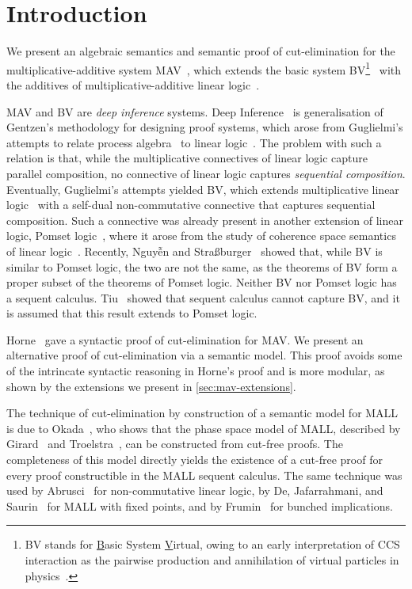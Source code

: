 \section{Introduction}\label{sec:introduction}

We present an algebraic semantics and semantic proof of cut-elimination for the multiplicative-additive system MAV~\cite{Horne15:mav}, which extends the basic system BV\footnote{
      BV stands for \underline{B}asic System \underline{V}irtual, owing to an early interpretation of CCS interaction as the pairwise production and annihilation of virtual particles in physics~\cite[]{Horne15:mav}.
}~\cite{Guglielmi99:bv,Guglielmi07:sis} with the additives of multiplicative-additive linear logic~\cite[MALL]{Girard87:ll}.

MAV and BV are \emph{deep inference} systems. Deep Inference~\cite{Guglielmi14:di} is generalisation of Gentzen's methodology for designing proof systems, which arose from Guglielmi's attempts to relate process algebra~\cite[CCS]{Milner80:CCS,Milner89:CC} to linear logic~\cite{Girard87:ll}.
The problem with such a relation is that, while the multiplicative connectives of linear logic capture parallel composition, no connective of linear logic captures \emph{sequential composition}.
Eventually, Guglielmi's attempts yielded BV, which extends multiplicative linear logic~\cite[MLL]{Girard87:ll} with a self-dual non-commutative connective that captures sequential composition.
Such a connective was already present in another extension of linear logic, Pomset logic~\cite{Retore97:pomset}, where it arose from the study of coherence space semantics of linear logic~\cite[]{GirardTL89:proofs}.
Recently, Nguyễn and Stra{\ss}burger~\cite{NguyenS22:bvisnotpl} showed that, while BV is similar to Pomset logic, the two are not the same, as the theorems of BV form a proper subset of the theorems of Pomset logic.
Neither BV nor Pomset logic has a sequent calculus. Tiu~\cite{Tiu06:sisii} showed that sequent calculus cannot capture BV, and it is assumed that this result extends to Pomset logic.

Horne~\cite{Horne15:mav} gave a syntactic proof of cut-elimination for MAV. We present an alternative proof of cut-elimination via a semantic model. This proof avoids some of the intrincate syntactic reasoning in Horne's proof and is more modular, as shown by the extensions we present in \cref{sec:mav-extensions}.

The technique of cut-elimination by construction of a semantic model for MALL is due to Okada~\cite{Okada99:psc}, who shows that the phase space model of MALL, described by Girard~\cite[\S4.1]{Girard87:ll} and Troelstra~\cite[]{Troelstra92:lll}, can be constructed from cut-free proofs.
The completeness of this model directly yields the existence of a cut-free proof for every proof constructible in the MALL sequent calculus.
The same technique was used by Abrusci~\cite{Abrusci91:psc} for non-commutative linear logic, by De, Jafarrahmani, and Saurin~\cite{De22:psc} for MALL with fixed points, and by Frumin~\cite{Frumin22:psc} for bunched implications.

